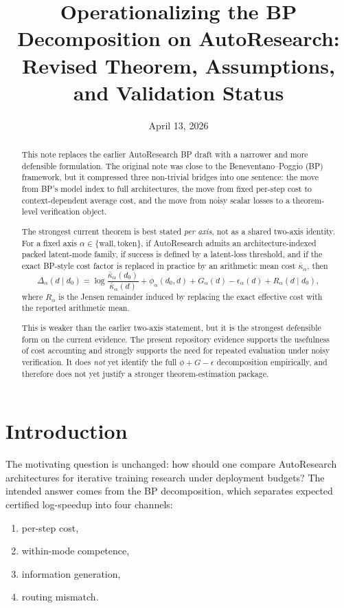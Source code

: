 \documentclass[11pt]{article}
\title{Operationalizing the BP Decomposition on AutoResearch:\\Revised Theorem, Assumptions, and Validation Status}
\author{}
\date{April 13, 2026}
\begin{document}
\maketitle

\begin{abstract}
This note replaces the earlier AutoResearch BP draft with a narrower and more defensible formulation.
The original note was close to the Beneventano--Poggio (BP) framework, but it compressed three
non-trivial bridges into one sentence: the move from BP's model index to full architectures, the
move from fixed per-step cost to context-dependent average cost, and the move from noisy scalar
losses to a theorem-level verification object.

The strongest current theorem is best stated \emph{per axis}, not as a shared two-axis identity.
For a fixed axis $\alpha \in \{\mathrm{wall}, \mathrm{token}\}$, if AutoResearch admits an
architecture-indexed packed latent-mode family, if success is defined by a latent-loss threshold,
and if the exact BP-style cost factor is replaced in practice by an arithmetic mean cost
$\bar\kappa_\alpha$, then
\[
\Delta_\alpha(d \mid d_0)
=
\log \frac{\bar\kappa_\alpha(d_0)}{\bar\kappa_\alpha(d)}
+ \phi_\alpha(d_0,d)
+ G_\alpha(d)
- \epsilon_\alpha(d)
+ R_\alpha(d \mid d_0),
\]
where $R_\alpha$ is the Jensen remainder induced by replacing the exact effective cost with the
reported arithmetic mean.

This is weaker than the earlier two-axis statement, but it is the strongest defensible form on the
current evidence. The present repository evidence supports the usefulness of cost accounting and
strongly supports the need for repeated evaluation under noisy verification. It does \emph{not}
yet identify the full $\phi + G - \epsilon$ decomposition empirically, and therefore does not yet
justify a stronger theorem-estimation package.
\end{abstract}

\section{Introduction}

The motivating question is unchanged: how should one compare AutoResearch architectures for
iterative training research under deployment budgets? The intended answer comes from the BP
decomposition, which separates expected certified log-speedup into four channels:

\begin{enumerate}
\item per-step cost,
\item within-mode competence,
\item information generation,
\item routing mismatch.
\end{enumerate}
\end{document}
